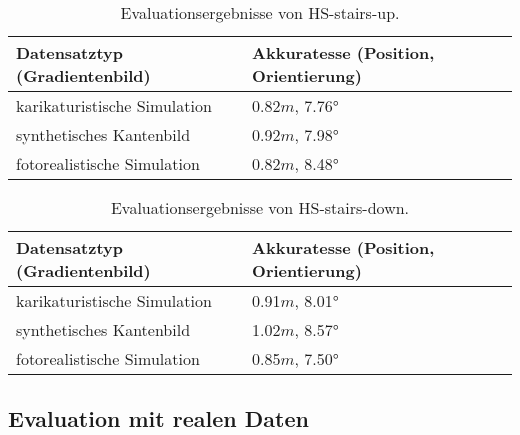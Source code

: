 \begin{table}
	\centering
	\caption{Evaluationsergebnisse von HS-stairs-up.}
	\begin{tabularx}{0.75\textwidth}{X X}\textbf{Datensatztyp} \hspace{2cm} (Gradientenbild)& \textbf{Akkuratesse} \hspace{2cm} (Position, Orientierung)\\
		\hline
		karikaturistische Simulation & 0.82$m$, 7.76°\\
		\hline
		synthetisches Kantenbild & 0.92$m$, 7.98°\\
		\hline
		fotorealistische Simulation & 0.82$m$, 8.48°\\
	\end{tabularx}
	\label{tab:synth_icloop}
\end{table}



\begin{table}
	\centering
	\caption{Evaluationsergebnisse von HS-stairs-down.}
	\begin{tabularx}{0.75\textwidth}{X X}\textbf{Datensatztyp} \hspace{2cm} (Gradientenbild)& \textbf{Akkuratesse} \hspace{2cm} (Position, Orientierung)\\
		\hline
		karikaturistische Simulation & 0.91$m$, 8.01°\\
		\hline
		synthetisches Kantenbild & 1.02$m$, 8.57°\\
		\hline
		fotorealistische Simulation & 0.85$m$, 7.50°\\
	\end{tabularx}
	\label{tab:synth_icloop}
\end{table}

\subsection{Evaluation mit realen Daten}